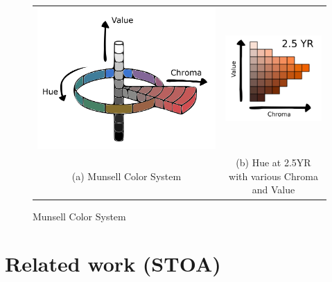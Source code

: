 \begin{figure}[!htb]
  \centering
\begin{tabular}{cc}
 \includegraphics[width=0.4\linewidth]{image/general/munsell.png}  &
 \includegraphics[width=0.4\linewidth]{image/general/25YR.png}\\
 (a) Munsell Color System &
(b) Hue at 2.5YR with various Chroma and Value\\
\end{tabular}
\caption{Munsell Color System} \label{fig:munsell}
\end{figure}


\section{Related work (STOA)}
\label{section:litreview}

